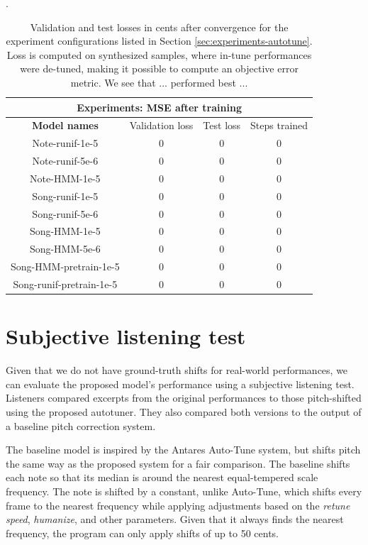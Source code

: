 \begin{table}
\centering.
\begin{tabular}{ |c|c|c|c| } 
\hline
\multicolumn{4}{|c|}{\textbf{Experiments: MSE after training}}\\
\hline\hline
\textbf{Model names} & Validation loss & Test loss & Steps trained \\
\hline\hline
Note-runif-1e-5 & 0 & 0 & 0  \\
\hline
Note-runif-5e-6 & 0 & 0 & 0  \\
\hline
Note-HMM-1e-5 & 0 & 0 & 0  \\ 
\hline
Song-runif-1e-5 & 0 & 0 & 0  \\ 
\hline
Song-runif-5e-6 & 0 & 0 & 0  \\ 
\hline
Song-HMM-1e-5 & 0 & 0 & 0  \\ 
\hline
Song-HMM-5e-6 & 0 & 0 & 0  \\ 
\hline
Song-HMM-pretrain-1e-5 & 0 & 0 & 0  \\ 
\hline
Song-runif-pretrain-1e-5 & 0 & 0 & 0  \\
\hline
\end{tabular}
\label{table:experiment-results}
\caption{Validation and test losses in cents after convergence for the experiment configurations listed in Section \ref{sec:experiments-autotune}. Loss is computed on synthesized samples, where in-tune performances were de-tuned, making it possible to compute an objective error metric. We see that ... performed best ...}
\end{table}
\section{Subjective listening test}
\label{sec:subjective-test}
Given that we do not have ground-truth shifts for real-world performances, we can evaluate the proposed model's performance using a subjective listening test. Listeners compared excerpts from the original performances to those pitch-shifted using the proposed autotuner. They also compared both versions to the output of a baseline pitch correction system. 

The baseline model is inspired by the Antares Auto-Tune system, but shifts pitch the same way as the proposed system for a fair comparison. The baseline shifts each note so that its median is around the nearest equal-tempered scale frequency. The note is shifted by a constant, unlike Auto-Tune, which shifts every frame to the nearest frequency while applying adjustments based on the \textit{retune speed}, \textit{humanize}, and other parameters. Given that it always finds the nearest frequency, the program can only apply shifts of up to 50 cents. 

